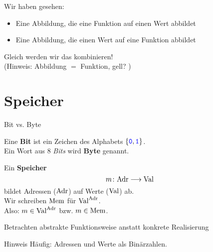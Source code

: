 \begin{frame}
	Wir haben gesehen:
	\begin{itemize}
		\item Eine Abbildung, die eine Funktion auf einen Wert abbildet
		\item Eine Abbildung, die einen Wert auf eine Funktion abbildet
	\end{itemize}
	Gleich werden wir das kombinieren! \\
	\medskip
	(Hinweis: Abbildung $=$ Funktion, gell? \smiley)
\end{frame}

\section{Speicher}

\begin{frame}{Bit vs. Byte}
	\begin{Definition}
		Eine \textbf{Bit} ist ein Zeichen des Alphabets $\{\hbox{\textcolor{blue}{\texttt{0}}}, \hbox{\textcolor{blue}{\texttt{1}}}\}$. \\
		Ein Wort aus 8 \emph{Bits} wird \textbf{Byte} genannt. 
	\end{Definition}
	\pause	
	
	\begin{Definition}
		Ein \textbf{Speicher} $$m \colon \text{Adr} \longrightarrow \text{Val}$$ bildet Adressen ($\text{Adr}$) auf Werte ($\text{Val}$) ab.\\
		Wir schreiben $\text{Mem}$ für $\text{Val}^{\text{Adr}}$. \\
		Also: $m \in \text{Val}^{\text{Adr}}$ \quad bzw. \quad $m \in \text{Mem}$.
	\end{Definition}
	\impl Betrachten abstrakte Funktionsweise anstatt konkrete Realisierung 
	\pause
	
	\begin{block}{Hinweis}
		Häufig: Adressen und Werte als Binärzahlen. \\
	\end{block}
\end{frame}

